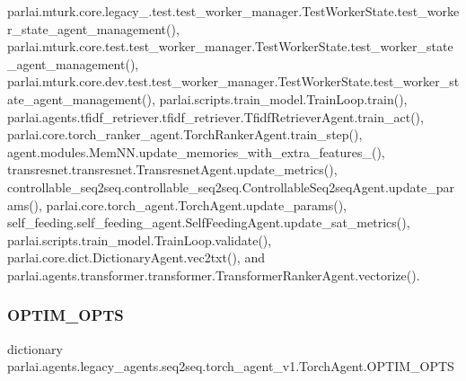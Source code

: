 parlai.\+mturk.\+core.\+legacy\+\_.\+test.\+test\+\_\+worker\+\_\+manager.\+Test\+Worker\+State.\+test\+\_\+worker\+\_\+state\+\_\+agent\+\_\+management(), parlai.\+mturk.\+core.\+test.\+test\+\_\+worker\+\_\+manager.\+Test\+Worker\+State.\+test\+\_\+worker\+\_\+state\+\_\+agent\+\_\+management(), parlai.\+mturk.\+core.\+dev.\+test.\+test\+\_\+worker\+\_\+manager.\+Test\+Worker\+State.\+test\+\_\+worker\+\_\+state\+\_\+agent\+\_\+management(), parlai.\+scripts.\+train\+\_\+model.\+Train\+Loop.\+train(), parlai.\+agents.\+tfidf\+\_\+retriever.\+tfidf\+\_\+retriever.\+Tfidf\+Retriever\+Agent.\+train\+\_\+act(), parlai.\+core.\+torch\+\_\+ranker\+\_\+agent.\+Torch\+Ranker\+Agent.\+train\+\_\+step(), agent.\+modules.\+Mem\+N\+N.\+update\+\_\+memories\+\_\+with\+\_\+extra\+\_\+features\+\_\+(), transresnet.\+transresnet.\+Transresnet\+Agent.\+update\+\_\+metrics(), controllable\+\_\+seq2seq.\+controllable\+\_\+seq2seq.\+Controllable\+Seq2seq\+Agent.\+update\+\_\+params(), parlai.\+core.\+torch\+\_\+agent.\+Torch\+Agent.\+update\+\_\+params(), self\+\_\+feeding.\+self\+\_\+feeding\+\_\+agent.\+Self\+Feeding\+Agent.\+update\+\_\+sat\+\_\+metrics(), parlai.\+scripts.\+train\+\_\+model.\+Train\+Loop.\+validate(), parlai.\+core.\+dict.\+Dictionary\+Agent.\+vec2txt(), and parlai.\+agents.\+transformer.\+transformer.\+Transformer\+Ranker\+Agent.\+vectorize().

\mbox{\label{classparlai_1_1agents_1_1legacy__agents_1_1seq2seq_1_1torch__agent__v1_1_1TorchAgent_ae574bf3e21ff941060ae0f3dcb284d8d}} 
\subsubsection{\texorpdfstring{O\+P\+T\+I\+M\+\_\+\+O\+P\+TS}{OPTIM\_OPTS}}
{\footnotesize\ttfamily dictionary parlai.\+agents.\+legacy\+\_\+agents.\+seq2seq.\+torch\+\_\+agent\+\_\+v1.\+Torch\+Agent.\+O\+P\+T\+I\+M\+\_\+\+O\+P\+TS\hspace{0.3cm}{\ttfamily [static]}}

